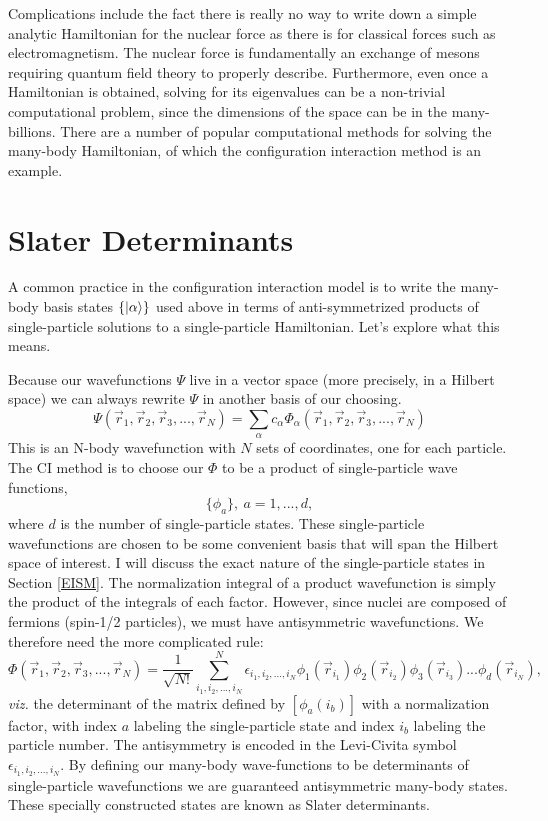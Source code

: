 Complications include the fact there is really no way to write down a simple 
analytic Hamiltonian for the nuclear force as there is for classical forces 
such as electromagnetism. The nuclear force is fundamentally an exchange of mesons
requiring quantum field theory to properly describe\cite{eisenberg}. 
Furthermore, even once a  Hamiltonian is obtained, solving for its eigenvalues 
can be a non-trivial computational problem, since the  dimensions of the space 
can be in the many-billions. There are a number of popular computational 
methods for solving the many-body Hamiltonian, of which the configuration 
interaction method is an example. 

\section{Slater Determinants} 
A common practice in the configuration interaction model is to write the 
many-body basis states $\{|\alpha\rangle\}$ used above in terms of anti-symmetrized 
products of single-particle solutions to a single-particle Hamiltonian.
 Let's explore what this means.  

Because our wavefunctions $\Psi$ live in a vector space (more precisely, in a 
Hilbert space) 
we can always rewrite $\Psi$ in another basis of our choosing.
\begin{equation}
	\Psi(\vec{r}_1,\vec{r}_2,\vec{r}_3,...,\vec{r}_N)=\sum_\alpha c_\alpha
\Phi_\alpha(\vec{r}_1,\vec{r}_2,\vec{r}_3,...,\vec{r}_N)
\end{equation}
This is an N-body wavefunction with $N$ sets of coordinates, one for each particle.
The CI method is to choose our $\Phi$ to be a product of single-particle wave
functions,
\begin{equation}
    \{ \phi_a \},\ a=1,...,d,
\end{equation}
where $d$ is the number of single-particle states. These single-particle 
wavefunctions are chosen to be some convenient basis that will span the Hilbert 
space of interest.  I will discuss the exact nature of the single-particle states
in Section \ref{EISM}.
The normalization integral of a product wavefunction is simply the product of 
the integrals of each factor. However, since nuclei are composed of 
fermions (spin-1/2 particles), we must have antisymmetric wavefunctions. 
We therefore need the more complicated rule\cite{Dirac}:
\begin{equation}\label{sld}
	\Phi(\vec{r}_1,\vec{r}_2,\vec{r}_3,...,\vec{r}_N)=\frac{1}{\sqrt{N!}}
    \sum_{i_1,i_2,...,i_N}^N \epsilon_{i_1,i_2,...,i_N}\phi_1(\vec{r}_{i_1})
    \phi_2(\vec{r}_{i_2})\phi_3(\vec{r}_{i_3})...\phi_d(\vec{r}_{i_N}),
\end{equation}
\textit{viz.} the determinant of the matrix defined by $[\phi_a(i_b)]$ 
with a normalization factor, with index $a$ labeling the single-particle state 
and index $i_b$ labeling the particle number. The antisymmetry is encoded in the Levi-Civita symbol 
$\epsilon_{i_1,i_2,...,i_N}$\cite{Jeevanjee}. By defining our many-body wave-functions to be 
determinants of single-particle wavefunctions we are guaranteed antisymmetric 
many-body states. These specially constructed states are known as Slater determinants\cite{Wong}. 

